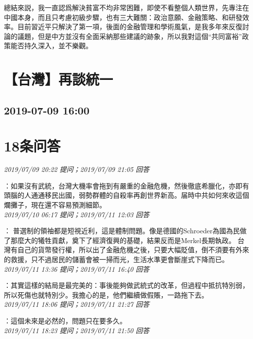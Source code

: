 \documentclass[twocolumn]{ctexart}
\begin{document}
總結來説，我一直認爲解決貧富不均非常困難，即使不看整個人類世界，先專注在中國本身，而且只考慮初級步驟，也有三大難關：政治意願、金融策略、和研發效率。目前習近平只解決了第一項，後面的金融管理和學術風氣，是我多年來反復討論的議題，但是中方並沒有全面采納那些建議的跡象，所以我對這個“共同富裕”政策能否持久深入，並不樂觀。
\\


\section{【台灣】再談統一}
\subsection{2019-07-09 16:00}


\section{18条问答}

\textit{\hfill\noindent\small 2019/07/09 20:22 提问；2019/07/09 21:05 回答}

：如果沒有武統，台灣大機率會拖到有嚴重的金融危機，然後徹底希臘化，亦即有頭腦的人通通移民出國，弱勢群體的自殺率再創世界新高。届時中共如何來收這個爛攤子，現在還不容易預測細節。
\\

\textit{\hfill\noindent\small 2019/07/10 06:17 提问；2019/07/11 12:03 回答}

：
普選制的領袖都是短視近利，這是體制問題。像是德國的Schroeder為國為民做了那麼大的犧牲貢獻，奠下了經濟復興的基礎，結果反而是Merkel長期執政。 
台灣有自己的貨幣發行權，所以出了金融危機之後，只要大幅貶值，倒不須要有外來的救援，只不過居民的儲蓄會被一掃而光，生活水準更會斷崖式下降而已。
\\

\textit{\hfill\noindent\small 2019/07/11 13:36 提问；2019/07/11 16:40 回答}

：其實這樣的結局是最完美的：事後能夠做武統式的改革，但過程中抵抗特別弱，所以死傷也就特別少。我擔心的是，他們繼續做假賬，一路拖下去。
\\

\textit{\hfill\noindent\small 2019/07/11 18:06 提问；2019/07/11 21:27 回答}

：這個未來是必然的，問題只在要多久。
\\

\textit{\hfill\noindent\small 2019/07/11 18:23 提问；2019/07/11 21:50 回答}
\end{document}
